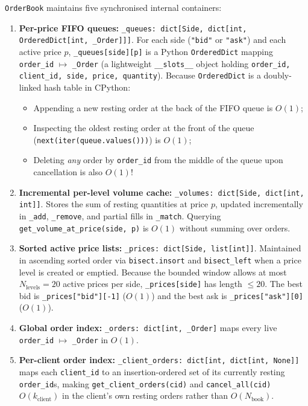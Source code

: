 \documentclass[11pt,a4paper]{article}
\newcommand{\code}[1]{\texttt{#1}}
\begin{document}
\code{OrderBook} maintains five synchronised internal containers:
\begin{enumerate}[nosep]
\item \textbf{Per-price FIFO queues:}
  \code{\_queues: dict[Side, dict[int, OrderedDict[int, \_Order]]]}. For each side (\code{"bid"} or
  \code{"ask"}) and each active price $p$, \code{\_queues[side][p]} is a Python \code{OrderedDict}
  mapping \code{order\_id} $\mapsto$ \code{\_Order} (a lightweight \code{\_\_slots\_\_} object holding
  \code{order\_id, client\_id, side, price, quantity}). Because \code{OrderedDict} is a doubly-linked
  hash table in CPython:
  \begin{itemize}[nosep]
  \item Appending a new resting order at the back of the FIFO queue is $O(1)$;
  \item Inspecting the oldest resting order at the front of the queue (\code{next(iter(queue.values()))})
    is $O(1)$;
  \item Deleting \emph{any} order by \code{order\_id} from the middle of the queue upon cancellation is
    also $O(1)$!
  \end{itemize}
\item \textbf{Incremental per-level volume cache:}
  \code{\_volumes: dict[Side, dict[int, int]]}. Stores the sum of resting quantities at price $p$,
  updated incrementally in \code{\_add}, \code{\_remove}, and partial fills in \code{\_match}. Querying
  \code{get\_volume\_at\_price(side, p)} is $O(1)$ without summing over orders.
\item \textbf{Sorted active price lists:}
  \code{\_prices: dict[Side, list[int]]}. Maintained in ascending sorted order via \code{bisect.insort}
  and \code{bisect\_left} when a price level is created or emptied. Because the bounded window allows at
  most $N_{\text{levels}} = 20$ active prices per side, \code{\_prices[side]} has length $\le 20$. The
  best bid is \code{\_prices["bid"][-1]} ($O(1)$) and the best ask is \code{\_prices["ask"][0]} ($O(1)$).
\item \textbf{Global order index:}
  \code{\_orders: dict[int, \_Order]} maps every live \code{order\_id} $\mapsto$ \code{\_Order} in $O(1)$.
\item \textbf{Per-client order index:}
  \code{\_client\_orders: dict[int, dict[int, None]]} maps each \code{client\_id} to an insertion-ordered
  set of its currently resting \code{order\_id}s, making \code{get\_client\_orders(cid)} and
  \code{cancel\_all(cid)} $O(k_{\text{client}})$ in the client's own resting orders rather than
  $O(N_{\text{book}})$.
\end{enumerate}
\end{document}
